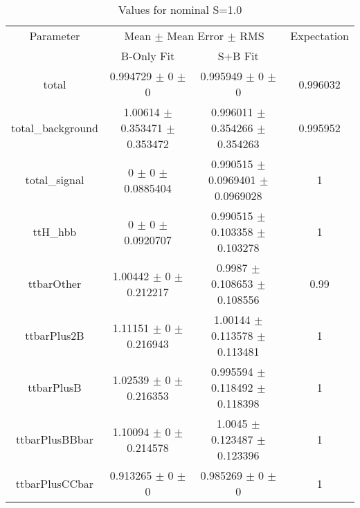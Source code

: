 \begin{table}
\centering
\caption{Values for nominal S=1.0}
\begin{tabular}{cccc}
\toprule
Parameter & \multicolumn{2}{c}{Mean $\pm$ Mean Error $\pm$ RMS} & Expectation\\
 & B-Only Fit & S+B Fit & \\
\midrule
total & \num{0.994729} $\pm$ \num{0} $\pm$ \num{0} & \num{0.995949} $\pm$ \num{0} $\pm$ \num{0} & \num{0.996032}\\
total\_background & \num{1.00614} $\pm$ \num{0.353471} $\pm$ \num{0.353472} & \num{0.996011} $\pm$ \num{0.354266} $\pm$ \num{0.354263} & \num{0.995952}\\
total\_signal & \num{0} $\pm$ \num{0} $\pm$ \num{0.0885404} & \num{0.990515} $\pm$ \num{0.0969401} $\pm$ \num{0.0969028} & \num{1}\\
ttH\_hbb & \num{0} $\pm$ \num{0} $\pm$ \num{0.0920707} & \num{0.990515} $\pm$ \num{0.103358} $\pm$ \num{0.103278} & \num{1}\\
ttbarOther & \num{1.00442} $\pm$ \num{0} $\pm$ \num{0.212217} & \num{0.9987} $\pm$ \num{0.108653} $\pm$ \num{0.108556} & \num{0.99}\\
ttbarPlus2B & \num{1.11151} $\pm$ \num{0} $\pm$ \num{0.216943} & \num{1.00144} $\pm$ \num{0.113578} $\pm$ \num{0.113481} & \num{1}\\
ttbarPlusB & \num{1.02539} $\pm$ \num{0} $\pm$ \num{0.216353} & \num{0.995594} $\pm$ \num{0.118492} $\pm$ \num{0.118398} & \num{1}\\
ttbarPlusBBbar & \num{1.10094} $\pm$ \num{0} $\pm$ \num{0.214578} & \num{1.0045} $\pm$ \num{0.123487} $\pm$ \num{0.123396} & \num{1}\\
ttbarPlusCCbar & \num{0.913265} $\pm$ \num{0} $\pm$ \num{0} & \num{0.985269} $\pm$ \num{0} $\pm$ \num{0} & \num{1}\\
\bottomrule
\end{tabular}
\end{table}